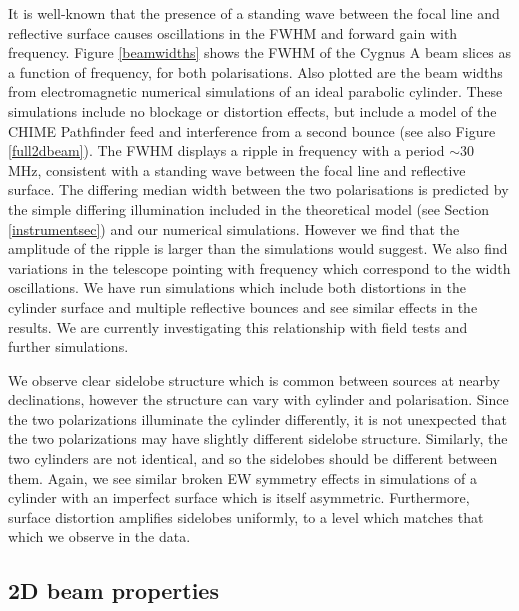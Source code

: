 It is well-known \citep{wander1, wander2} that the presence of a standing wave between the focal line and reflective surface causes oscillations in the FWHM and forward gain with frequency. Figure \ref{beamwidths} shows the FWHM of the Cygnus A beam slices as a function of frequency, for both polarisations. Also plotted are the beam widths from electromagnetic numerical simulations of an ideal parabolic cylinder. These simulations include no blockage or distortion effects, but include a model of the CHIME Pathfinder feed \citep{meiling} and interference from a second bounce (see also Figure \ref{full2dbeam}). The FWHM displays a ripple in frequency with a period $\sim$30 MHz, consistent with a standing wave between the focal line and reflective surface. The differing median width between the two polarisations is predicted by the simple differing illumination included in the theoretical model (see Section \ref{instrumentsec}) and our numerical simulations. However we find that the amplitude of the ripple is larger than the simulations would suggest. We also find variations in the telescope pointing with frequency which correspond to the width oscillations. We have run simulations which include both distortions in the cylinder surface and multiple reflective bounces and see similar effects in the results. We are currently investigating this relationship with field tests and further simulations.

We observe clear sidelobe structure which is common between sources at nearby declinations, however the structure can vary with cylinder and polarisation. Since the two polarizations illuminate the cylinder differently, it is not unexpected that the two polarizations may have slightly different sidelobe structure. Similarly, the two cylinders are not identical, and so the sidelobes should be different between them. Again, we see similar broken EW symmetry effects in simulations of a cylinder with an imperfect surface which is itself asymmetric. Furthermore, surface distortion amplifies sidelobes uniformly, to a level which matches that which we observe in the data.

\subsection{2D beam properties}

